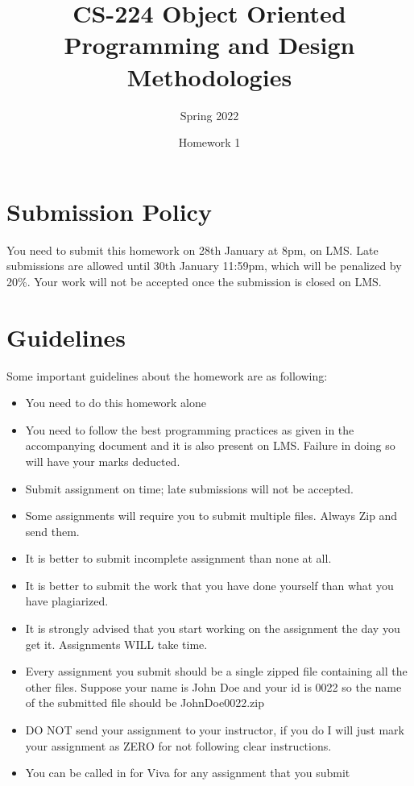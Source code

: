 \documentclass[a4paper,12pt]{article}
\begin{document}
	
	\title{CS-224 Object Oriented Programming and Design Methodologies }
	\author{Spring 2022}
	\date{Homework 1}
	\maketitle
	\section{Submission Policy}
	You need to submit this homework on  {\color{blue}28th January at 8pm}, on LMS. Late submissions are allowed until {\color{red} 30th January 11:59pm}, which will be penalized by 20\%. Your work will not be accepted once the submission is closed on LMS.
	
	\section{Guidelines}
		Some important guidelines about the homework are as following:
	\begin{itemize}
		\item You need to do this homework alone

		\item You need to follow the best programming practices as given in the accompanying document and it is also present on LMS. Failure in doing so will have your marks deducted.
		\item Submit assignment on time; late submissions will not be accepted.
		\item Some assignments will require you to submit multiple files. Always Zip and send them.
		\item It is better to submit incomplete assignment than none at all.
		\item It is better to submit the work that you have done yourself than what you have plagiarized.
		\item It is strongly advised that you start working on the assignment the day you get it. Assignments WILL take time.
		\item Every assignment you submit should be a single zipped file containing all the other files. Suppose your name is John Doe and your id is 0022 so the name of the submitted file should be JohnDoe0022.zip
		\item DO NOT send your assignment to your instructor, if you do I will just mark your assignment as ZERO for not following clear instructions.
		\item You can be called in for Viva for any assignment that you submit
	\end{itemize}
	
\end{document}
